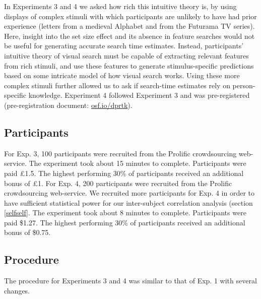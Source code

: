\documentclass[12pt,twoside]{reedthesis}
\begin{document}
In Experiments 3 and 4 we asked how rich this intuitive theory is, by using displays of complex stimuli with which participants are unlikely to have had prior experience (letters from a medieval Alphabet and from the Futurama TV series). Here, insight into the set size effect and its absence in feature searches would not be useful for generating accurate search time estimates. Instead, participants' intuitive theory of visual search must be capable of extracting relevant features from rich stimuli, and use these features to generate stimulus-specific predictions based on some intricate model of how visual search works. Using these more complex stimuli further allowed us to ask if search-time estimates rely on person-specific knowledge. Experiment 4 followed Experiment 3 and was pre-registered (pre-registration document: \url{osf.io/dprtk}).

\hypertarget{participants-3}{%
\subsection{Participants}\label{participants-3}}

For Exp. 3, 100 participants were recruited from the Prolific crowdsourcing web-service. The experiment took about 15
minutes to complete. Participants were paid £1.5. The highest performing 30\% of participants received an additional bonus of £1. For Exp. 4, 200 participants were recruited from the Prolific crowdsourcing web-service. We recruited more participants for Exp. 4 in order to have sufficient statistical power for our inter-subject correlation analysis (section \ref{selfself}. The experiment took about 8 minutes to complete. Participants were paid \$1.27. The highest performing 30\% of participants received an additional bonus of \$0.75.

\hypertarget{procedure-3}{%
\subsection{Procedure}\label{procedure-3}}

The procedure for Experiments 3 and 4 was similar to that of Exp. 1 with several changes.
\end{document}
